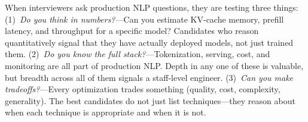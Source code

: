 \begin{keyinsight}
When interviewers ask production NLP questions, they are testing three things:
(1)~\emph{Do you think in numbers?}---Can you estimate KV-cache memory, prefill latency,
and throughput for a specific model?  Candidates who reason quantitatively signal that
they have actually deployed models, not just trained them.
(2)~\emph{Do you know the full stack?}---Tokenization, serving, cost, and monitoring are
all part of production NLP.  Depth in any one of these is valuable, but breadth across all
of them signals a staff-level engineer.
(3)~\emph{Can you make tradeoffs?}---Every optimization trades something (quality, cost,
complexity, generality).  The best candidates do not just list techniques---they reason
about when each technique is appropriate and when it is not.
\end{keyinsight}
